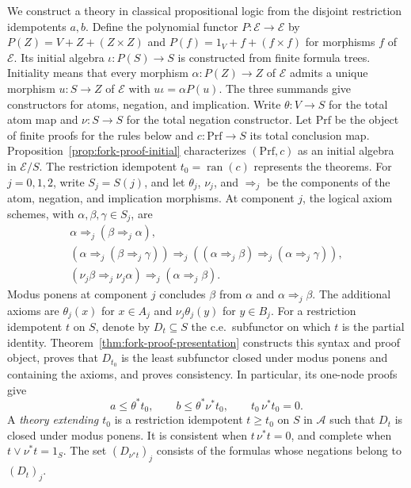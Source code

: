 \documentclass[11pt]{article}
\newcommand{\ran}{\operatorname{ran}}
\begin{document}
We construct a theory in classical propositional logic from the
disjoint restriction idempotents $a,b$. Define the polynomial functor
$P:\mathcal E\to\mathcal E$ by
$P(Z)=V+Z+(Z\times Z)$ and
$P(f)=1_V+f+(f\times f)$ for morphisms $f$ of $\mathcal E$.
Its initial algebra $\iota:P(S)\to S$ is constructed from finite
formula trees. Initiality means that every morphism
$\alpha:P(Z)\to Z$ of $\mathcal E$ admits a unique morphism $u:S\to Z$
of $\mathcal E$
with $u\iota=\alpha P(u)$.
The three summands give constructors for atoms, negation, and implication.
Write $\theta:V\to S$ for the total atom map
and $\nu:S\to S$ for the total negation constructor.
Let $\mathrm{Prf}$ be the object of finite proofs for the rules below
and $c:\mathrm{Prf}\to S$ its total conclusion map.
Proposition~\ref{prop:fork-proof-initial} characterizes $(\mathrm{Prf},c)$
as an initial algebra in $\mathcal E/S$.
The restriction idempotent $t_0=\ran(c)$ represents the theorems.
For $j=0,1,2$, write $S_j=S(j)$, and let $\theta_j$, $\nu_j$,
and $\Rightarrow_j$ be the components of the atom, negation,
and implication morphisms. At component $j$, the logical axiom
schemes, with $\alpha,\beta,\gamma\in S_j$, are
\[
\begin{gathered}
 \alpha\Rightarrow_j(\beta\Rightarrow_j\alpha),\\
 (\alpha\Rightarrow_j(\beta\Rightarrow_j\gamma))
   \Rightarrow_j((\alpha\Rightarrow_j\beta)\Rightarrow_j
                         (\alpha\Rightarrow_j\gamma)),\\
 (\nu_j\beta\Rightarrow_j\nu_j\alpha)
       \Rightarrow_j(\alpha\Rightarrow_j\beta).
\end{gathered}
\]
Modus ponens at component $j$ concludes $\beta$ from $\alpha$
and $\alpha\Rightarrow_j\beta$. The additional axioms are
$\theta_j(x)$ for $x\in A_j$ and $\nu_j\theta_j(y)$ for $y\in B_j$.
For a restriction idempotent $t$ on $S$, denote by $D_t\subseteq S$
the c.e.\ subfunctor on which $t$ is the partial identity.
Theorem~\ref{thm:fork-proof-presentation} constructs this syntax and
proof object, proves that $D_{t_0}$ is the least
subfunctor closed under modus ponens and containing the axioms, and proves
consistency. In particular, its one-node proofs give
\begin{equation}\label{eq:atomic-inequalities}
 a\le\theta^*t_0,\qquad
 b\le\theta^*\nu^*t_0,\qquad t_0\,\nu^*t_0=0.
\end{equation}
A \emph{theory extending $t_0$} is a restriction idempotent $t\ge t_0$
on $S$ in $\mathcal A$ such that $D_t$ is closed under modus ponens.
It is consistent when $t\,\nu^*t=0$, and complete when
$t\vee\nu^*t=1_S$. The set $(D_{\nu^*t})_j$ consists of the
formulas whose negations belong to $(D_t)_j$.
\end{document}
